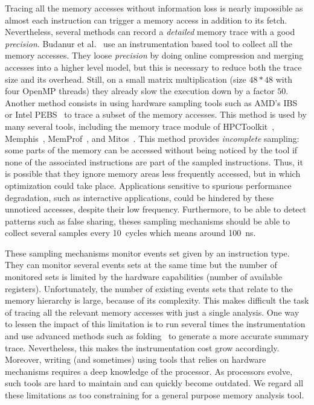 Tracing all the memory accesses without information loss is nearly impossible as almost each instruction can trigger a memory access in addition to its fetch.
Nevertheless, several methods can record a \emph{detailed} memory trace with a good \emph{precision}.
Budanur et al.~\cite{Budanur11Memory} use an instrumentation based tool to collect all the memory accesses.
They loose \emph{precision} by doing online compression and merging accesses into a higher level model, but this is necessary to reduce both the trace size and its overhead.
Still, on a small matrix multiplication (size $48*48$ with four \gls{OpenMP} threads) they already slow the execution down by a factor $50$.
Another method consists in using hardware sampling tools such as AMD's \gls{IBS}~\cite{Drongowski07Instructionbased} or Intel \gls{PEBS}~\cite{Levinthal09Performance} to trace a subset of the memory accesses.
This method is used by many several tools, including the memory trace module of \gls{HPCToolkit}~\cite{Liu14Tool}, \gls{Memphis}~\cite{McCurdy10Memphis}, \gls{MemProf}~\cite{Lachaize12MemProf}, and \gls{Mitos}~\cite{Gimenez14Dissecting}.
This method provides \emph{incomplete} sampling: some parts of the memory can be accessed without being noticed by the tool if none of the associated instructions are part of the sampled instructions.
Thus, it is possible that they ignore memory areas less frequently accessed, but in which optimization could take place.
Applications sensitive to spurious performance degradation, such as interactive applications, could be hindered by these unnoticed accesses, despite their low frequency.
Furthermore, to be able to detect patterns such as false sharing, theses sampling mechanisms should be able to collect several samples every \SI{10}{cycles} which means around \SI{100}{ns}.

These sampling mechanisms monitor events set given by an instruction type.
They can monitor several events sets at the same time but the number of monitored sets is limited by the hardware capabilities (number of available registers).
Unfortunately, the number of existing events sets that relate to the memory hierarchy is large, because of its complexity.
This makes difficult the task of tracing all the relevant memory accesses with just a single analysis.
One way to lessen the impact of this limitation is to run several times the instrumentation and use advanced methods such as folding~\cite{Servat15Towards} to generate a more accurate summary trace.
Nevertheless, this makes the instrumentation cost grow accordingly.
Moreover, writing (and sometimes) using tools that relies on hardware mechanisms requires a deep knowledge of the processor.
As processors evolve, such tools are hard to maintain and can quickly become outdated.
We regard all these limitations as too constraining for a general purpose memory analysis tool.

